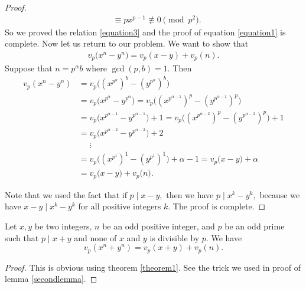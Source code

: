 \documentclass[main.tex]{subfile}
\begin{document}
\begin{proof}
\begin{align*}
                & \equiv px^{p-1} \not \equiv 0 \pmod{p^2}.
            \end{align*}
        So we proved the relation \eqref{equation3} and the proof of equation \eqref{equation1} is complete.  Now let us return to our problem. We want to show that
            \begin{align*}
            v_p\big(  x^n - y^n \big) = v_p(  x - y ) + v_p(  n ).
            \end{align*}
        Suppose that $n=p^{\alpha}b$ where $\gcd(p,b)=1.$ Then
            \begin{align*}
                v_p(x^n-y^n) & =  v_p\big((x^{p^{\alpha}})^b - (y^{p^{\alpha}})^b \big)  \\
                & =   v_p\big(  x^{p^{\alpha}} -y^{p^{\alpha}}\big) =v_p\big(  (x^{p^{\alpha-1}})^p - (y^{p^{\alpha-1}})^p \big) \\
                & = v_p\big(  x^{p^{\alpha-1}} - y^{p^{\alpha-1}} \big) + 1 =v_p\big(  (x^{p^{\alpha-2}})^p - (y^{p^{\alpha-2}})^p\big) +1  \\
                & = v_p\big(  x^{p^{\alpha-2}} - y^{p^{\alpha-2}} \big) + 2 \\
                & \phantom{=} \vdots \\
                & = v_p\big(  (x^{p^{1}})^1 - (y^{p^{1}})^1  \big) + \alpha -1  = v_p\big(  x-y \big) + \alpha \\
                & =v_p\big(  x-y \big) + v_p\big(  n \big) .
            \end{align*}

        Note that we used the fact that if $p \mid x-y,$ then we have $p \mid x^k -y^k,$ because we have $x-y \mid x^k-y^k$ for all positive integers $k.$ The proof is complete.
    \end{proof}



    \begin{theorem}\label{theorem2}
        Let $ x,y$ be two integers, $n$ be an odd positive integer, and $p$ be an odd prime such that $ p\mid x + y$ and none of
        $x$ and $y$ is divisible by $p.$  We have
        \[ v_p(  x^n + y^n ) = v_p(  x + y ) + v_p(  n ). \]
    \end{theorem}

    \begin{proof}
        This is obvious using theorem \eqref{theorem1}. See the trick we used in proof of lemma \eqref{secondlemma}.
	\end{proof}
\end{document}
